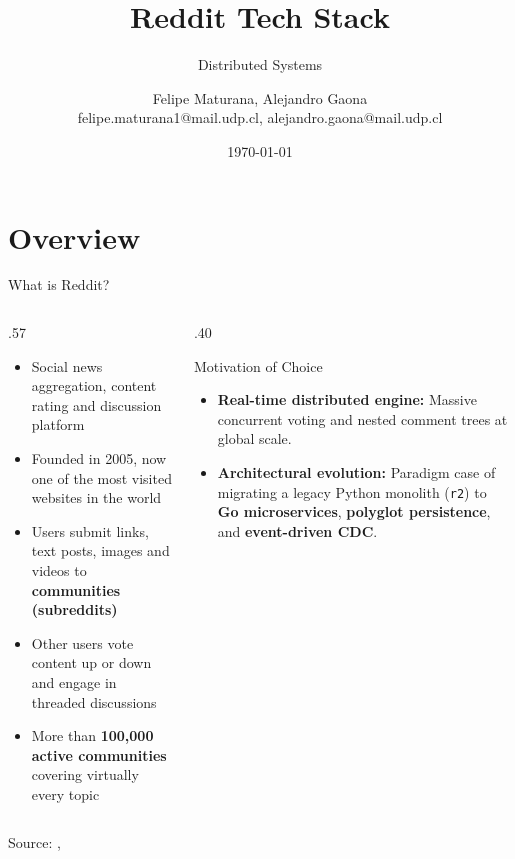 \documentclass[
  aspectratio=169,
]{beamer}
\title[Reddit Tech Stack]{Reddit Tech Stack}
\subtitle[Distributed Systems]{Distributed Systems}
\author[F. Maturana, A. Gaona]{Felipe Maturana, Alejandro Gaona\texorpdfstring{\\}{, }felipe.maturana1@mail.udp.cl, alejandro.gaona@mail.udp.cl}
\institute{}
\date{\today}
\begin{document}
\begin{frame}[plain]
\maketitle
\end{frame}

\section{Overview}
\begin{frame}{What is Reddit?}
  \begin{columns}[T]
    \begin{column}{.57\textwidth}
      \begin{itemize}
        \item Social news aggregation, content rating and discussion platform
        \item Founded in 2005, now one of the \alert{most visited websites} in the world
        \item Users submit links, text posts, images and videos to \textbf{communities (subreddits)}
        \item Other users vote content up or down and engage in threaded discussions
        \item More than \textbf{100,000 active communities} covering virtually every topic
      \end{itemize}
    \end{column}
    \begin{column}{.40\textwidth}
      \begin{block}{Motivation of Choice}
        \begin{itemize}
          \item \textbf{Real-time distributed engine:} Massive concurrent voting and nested comment trees at global scale.
          \item \textbf{Architectural evolution:} Paradigm case of migrating a legacy Python monolith (\texttt{r2}) to \textbf{Go microservices}, \textbf{polyglot persistence}, and \textbf{event-driven CDC}.
        \end{itemize}
      \end{block}
    \end{column}
  \end{columns}
  \vspace{2mm}
  {\footnotesize Source: \cite{stackshare2024reddit}, \cite{bytebytego2024reddit}}
\end{frame}
\end{document}
